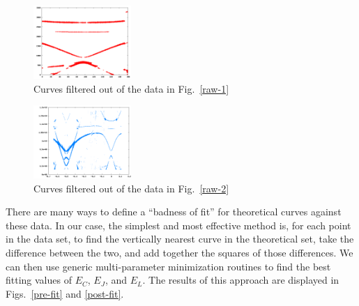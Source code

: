 \documentclass[twocolumn]{revtex4}
\newcommand{\figwidth}{0.33\textwidth}
\begin{document}
\begin{figure}
\includegraphics[width=\figwidth]{colorful-points.png}
\caption{ Curves filtered out of the data in Fig.~\ref{raw-1} }
\label{filter-1}
\end{figure}

\begin{figure}
\includegraphics[width=\figwidth]{CPBL-data.png}
\caption{ Curves filtered out of the data in Fig.~\ref{raw-2} }
\label{filter-2}
\end{figure}

There are many ways to define a ``badness of fit'' for theoretical
curves against these data. In our case, the simplest and most
effective method is, for each point in the data set, to find the
vertically nearest curve in the theoretical set, take the difference
between the two, and add together the squares of those differences. We
can then use generic multi-parameter minimization routines to find the
best fitting values of $E_C$, $E_J$, and $E_L$.\cite{Byrd}\cite{Zhu}
The results of this approach are displayed in Figs.~\ref{pre-fit} and
\ref{post-fit}.
\end{document}
